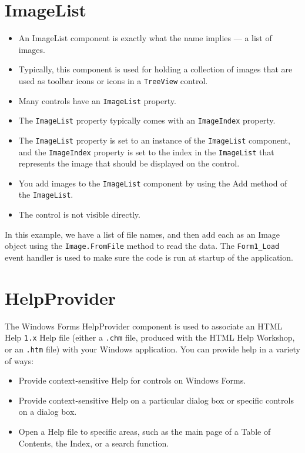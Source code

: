 \section{ImageList}
\begin{itemize}
	\item An ImageList component is exactly what the name implies — a list of images. 
	\item Typically, this component is used for holding a collection of images that are used as toolbar icons or icons in a \texttt{TreeView} control. 
	\item Many controls have an \texttt{ImageList} property. 
	\item The \texttt{ImageList} property typically comes with an \texttt{ImageIndex} property. 
	\item The \texttt{ImageList} property is set to an instance of the \texttt{ImageList} component, and the \texttt{ImageIndex} property is set to the index in the \texttt{ImageList} that represents the image that should be displayed on the control. 
	\item You add images to the \texttt{ImageList} component by using the Add method of the \texttt{ImageList}. 
	\item The control is not visible directly.
\end{itemize}

In this example, we have a list of file names, and then add each as an Image object using the \texttt{Image.FromFile} method to read the data. The \verb*|Form1_Load| event handler is used to make sure the code is run at startup of the application.






\section{HelpProvider}
The Windows Forms HelpProvider component is used to associate an HTML Help \texttt{1.x} Help file (either a \texttt{.chm} file, produced with the HTML Help Workshop, or an \texttt{.htm} file) with your Windows application. You can provide help in a variety of ways:
\begin{itemize}
	\item Provide context-sensitive Help for controls on Windows Forms.
	
	\item Provide context-sensitive Help on a particular dialog box or specific controls on a dialog box.
	
	\item Open a Help file to specific areas, such as the main page of a Table of Contents, the Index, or a search function.
\end{itemize}

